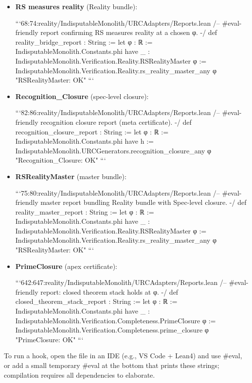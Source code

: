 \documentclass{article}
\begin{document}
\begin{itemize}[leftmargin=*]
  \item \textbf{RS measures reality} (Reality bundle):

```68:74:reality/IndisputableMonolith/URCAdapters/Reports.lean
/-- #eval-friendly report confirming RS measures reality at a chosen φ. -/
 def reality_bridge_report : String :=
  let φ : ℝ := IndisputableMonolith.Constants.phi
  have _ : IndisputableMonolith.Verification.Reality.RSRealityMaster φ :=
    IndisputableMonolith.Verification.Reality.rs_reality_master_any φ
  "RSRealityMaster: OK"
```

  \item \textbf{Recognition\_Closure} (spec-level closure):

```82:86:reality/IndisputableMonolith/URCAdapters/Reports.lean
/-- #eval-friendly recognition closure report (meta certificate). -/
 def recognition_closure_report : String :=
  let φ : ℝ := IndisputableMonolith.Constants.phi
  have h := IndisputableMonolith.URCGenerators.recognition_closure_any φ
  "Recognition_Closure: OK"
```

  \item \textbf{RSRealityMaster} (master bundle):

```75:80:reality/IndisputableMonolith/URCAdapters/Reports.lean
/-- #eval-friendly master report bundling Reality bundle with Spec-level closure. -/
 def reality_master_report : String :=
  let φ : ℝ := IndisputableMonolith.Constants.phi
  have _ : IndisputableMonolith.Verification.Reality.RSRealityMaster φ :=
    IndisputableMonolith.Verification.Reality.rs_reality_master_any φ
  "RSRealityMaster: OK"
```

  \item \textbf{PrimeClosure} (apex certificate):

```642:647:reality/IndisputableMonolith/URCAdapters/Reports.lean
/-- #eval-friendly report: closed theorem stack holds at φ. -/
 def closed_theorem_stack_report : String :=
  let φ : ℝ := IndisputableMonolith.Constants.phi
  have _ : IndisputableMonolith.Verification.Completeness.PrimeClosure φ :=
    IndisputableMonolith.Verification.Completeness.prime_closure φ
  "PrimeClosure: OK"
```
\end{itemize}

To run a hook, open the file in an IDE (e.g., VS Code + Lean4) and use \#eval, or add a small temporary \#eval at the bottom that prints these strings; compilation requires all dependencies to elaborate.
\end{document}
